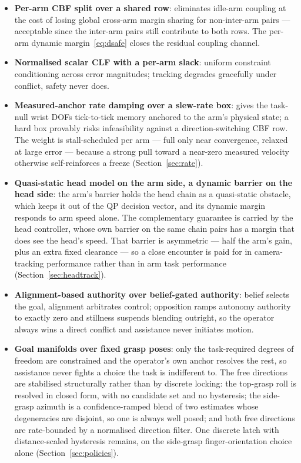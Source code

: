 \documentclass[12pt,a4paper,twoside,openright]{report}
\begin{document}
\begin{itemize}[nosep]
\item \textbf{Per-arm CBF split over a shared row}: eliminates idle-arm coupling at the cost of losing global cross-arm margin sharing for non-inter-arm pairs --- acceptable since the inter-arm pairs still contribute to both rows. The per-arm dynamic margin~\eqref{eq:dsafe} closes the residual coupling channel.
\item \textbf{Normalised scalar CLF with a per-arm slack}: uniform constraint conditioning across error magnitudes; tracking degrades gracefully under conflict, safety never does.
\item \textbf{Measured-anchor rate damping over a slew-rate box}: gives the task-null wrist DOFs tick-to-tick memory anchored to the arm's physical state; a hard box provably risks infeasibility against a direction-switching CBF row. The weight is stall-scheduled per arm --- full only near convergence, relaxed at large error --- because a strong pull toward a near-zero measured velocity otherwise self-reinforces a freeze (Section~\ref{sec:rate}).
\item \textbf{Quasi-static head model on the arm side, a dynamic barrier on the head side}: the arm's barrier holds the head chain as a quasi-static obstacle, which keeps it out of the QP decision vector, and its dynamic margin responds to arm speed alone. The complementary guarantee is carried by the head controller, whose own barrier on the same chain pairs has a margin that does see the head's speed. That barrier is asymmetric --- half the arm's gain, plus an extra fixed clearance --- so a close encounter is paid for in camera-tracking performance rather than in arm task performance (Section~\ref{sec:headtrack}).
\item \textbf{Alignment-based authority over belief-gated authority}: belief selects the goal, alignment arbitrates control; opposition ramps autonomy authority to exactly zero and stillness suspends blending outright, so the operator always wins a direct conflict and assistance never initiates motion.
\item \textbf{Goal manifolds over fixed grasp poses}: only the task-required degrees of freedom are constrained and the operator's own anchor resolves the rest, so assistance never fights a choice the task is indifferent to. The free directions are stabilised structurally rather than by discrete locking: the top-grasp roll is resolved in closed form, with no candidate set and no hysteresis; the side-grasp azimuth is a confidence-ramped blend of two estimates whose degeneracies are disjoint, so one is always well posed; and both free directions are rate-bounded by a normalised direction filter. One discrete latch with distance-scaled hysteresis remains, on the side-grasp finger-orientation choice alone (Section~\ref{sec:policies}).

\end{itemize}
\end{document}
